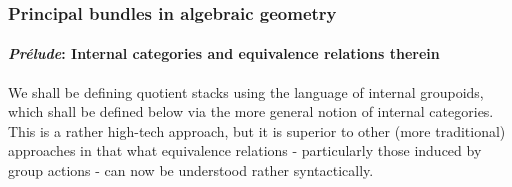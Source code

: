             \subsubsection{Principal bundles in algebraic geometry}
                \paragraph{\textit{Pr\'elude}: Internal categories and equivalence relations therein}
                    We shall be defining quotient stacks using the language of internal groupoids, which shall be defined below via the more general notion of internal categories. This is a rather high-tech approach, but it is superior to other (more traditional) approaches in that what equivalence relations - particularly those induced by group actions - can now be understood rather syntactically.
                
